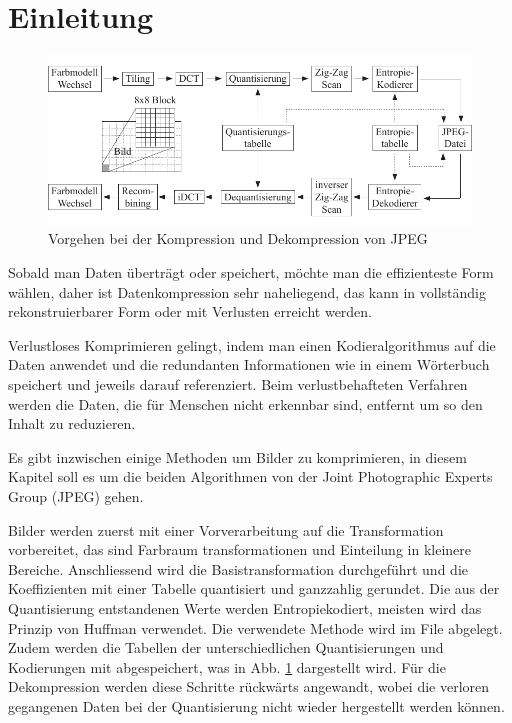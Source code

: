 %
%
%
%
\section{Einleitung\label{jpeg:section:einleitung}}
\begin{figure}
    \centering
    \includegraphics[width=\linewidth]{papers/jpeg/pictures/kompressionsschema.pdf}
    \caption{Vorgehen bei der Kompression und Dekompression von JPEG
        \label{jpeg:fig:kompressionsschema}}
\end{figure}
Sobald man Daten überträgt oder speichert, möchte man die effizienteste Form wählen, daher ist Datenkompression sehr naheliegend, das kann in vollständig rekonstruierbarer Form oder mit Verlusten erreicht werden.

Verlustloses Komprimieren gelingt, indem man einen Kodieralgorithmus auf die Daten anwendet und die redundanten Informationen wie in einem Wörterbuch speichert und jeweils darauf referenziert. Beim verlustbehafteten Verfahren werden die Daten, die für Menschen nicht erkennbar sind, entfernt um so den Inhalt zu reduzieren.

Es gibt inzwischen einige Methoden um Bilder zu komprimieren, in diesem Kapitel soll es um die beiden Algorithmen von der Joint Photographic Experts Group (JPEG) gehen.

Bilder werden zuerst mit einer Vorverarbeitung auf die Transformation vorbereitet, das sind Farb\-raum transformationen und Einteilung in kleinere Bereiche.
Anschliessend wird die Basistransformation durchgeführt und die Koeffizienten mit einer Tabelle quantisiert und ganzzahlig gerundet.
Die aus der Quantisierung entstandenen Werte werden Entropiekodiert, meisten wird das Prinzip von Huffman verwendet.
Die verwendete Methode wird im File abgelegt.
Zudem werden die Tabellen der unterschiedlichen Quantisierungen und Kodierungen mit abgespeichert, was in Abb. \ref{jpeg:fig:kompressionsschema} dargestellt wird.
Für die Dekompression werden diese Schritte rückwärts angewandt, wobei die verloren gegangenen Daten bei der Quantisierung nicht wieder hergestellt werden können. 

